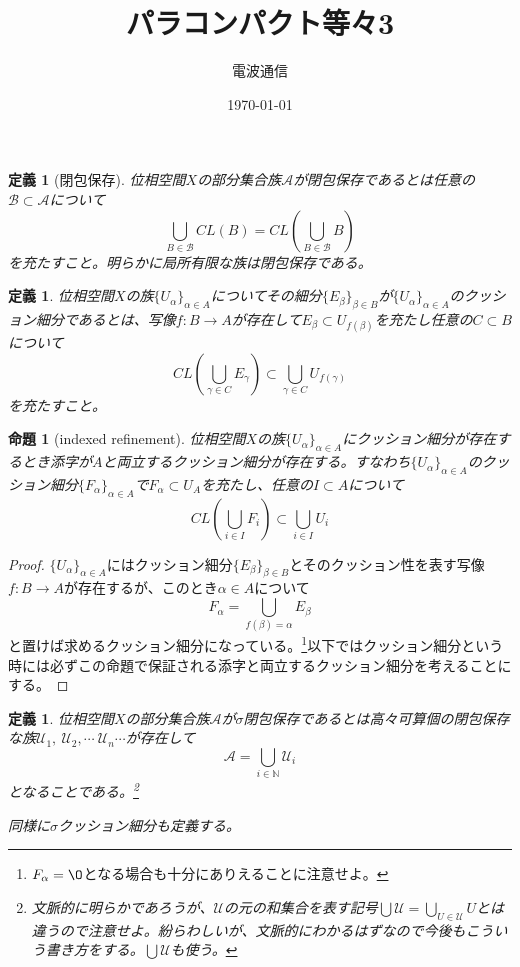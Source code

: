 \documentclass[leqno]{jsarticle}
\title{パラコンパクト等々3}
\author{電波通信}
\date{\today}
\newtheorem{prop}[thm]{命題}
\newtheorem{df}[thm]{定義}
\newcommand{\nn}{\mathbb{N}}
\newcommand{\dpst}{\displaystyle}
\newcommand{\al}{\alpha}
\newcommand{\be}{\beta}
\begin{document}
\maketitle
\begin{df}[閉包保存]
位相空間$X$の部分集合族$\mathcal{A}$が閉包保存であるとは任意の$\mathcal{B}\subset \mathcal{A}$について
\[
\bigcup_{B\in \mathcal{B}}CL(B)=CL(\bigcup_{B\in \mathcal{B}}B)
\]
を充たすこと。明らかに局所有限な族は閉包保存である。
\end{df}

\begin{df}
位相空間$X$の族$\{U_{\al}\}_{\al\in A}$についてその細分$\{E_{\be}\}_{\be\in B}$が$\{U_{\al}\}_{\al\in A}$のクッション細分であるとは、写像$f:B\to A$が存在して$E_{\be}\subset U_{f(\be)}$を充たし任意の$C\subset B$について
\[
CL(\bigcup_{\gamma\in C}E_{\gamma})\subset \bigcup_{\gamma\in C}U_{f(\gamma)}
\]
を充たすこと。
\end{df}

\begin{prop}[indexed refinement]
位相空間$X$の族$\{U_{\al}\}_{\al\in A}$にクッション細分が存在するとき添字が$A$と両立するクッション細分が存在する。すなわち$\{U_{\al}\}_{\al\in A}$のクッション細分$\{F_{\al}\}_{\al\in A}$で$F_{\al}\subset U_A$を充たし、任意の$I\subset A$について
\[
CL(\bigcup_{i\in I}F_{i})\subset \bigcup_{i\in I}U_i
\]
\end{prop}
\begin{proof}
$\{U_{\al}\}_{\al\in A}$にはクッション細分$\{E_{\be}\}_{\be\in B}$とそのクッション性を表す写像$f:B\to A$が存在するが、このとき$\al\in A$について
\[
F_{\al}=\bigcup_{f(\be)=\al}E_{\be}
\]
と置けば求めるクッション細分になっている。\footnote{$F_{\al}=\O$となる場合も十分にありえることに注意せよ。}以下ではクッション細分という時には必ずこの命題で保証される添字と両立するクッション細分を考えることにする。
\end{proof}
\begin{df}
位相空間$X$の部分集合族$\mathcal{A}$が$\sigma$閉包保存であるとは高々可算個の閉包保存な族$\mathcal{U}_1,\ \mathcal{U}_2,\cdots\ \mathcal{U}_n\cdots$が存在して
\[
\mathcal{A}=\bigcup_{i\in \nn}\mathcal{U}_i
\]
となることである。\footnote{文脈的に明らかであろうが、$\mathcal{U}$の元の和集合を表す記号$\dpst \bigcup\mathcal{U}=\bigcup_{U\in \mathcal{U}}U$とは違うので注意せよ。紛らわしいが、文脈的にわかるはずなので今後もこういう書き方をする。$\bigcup\mathcal{U}$も使う。}\par
同様に$\sigma$クッション細分も定義する。
\end{df}
\end{document}
